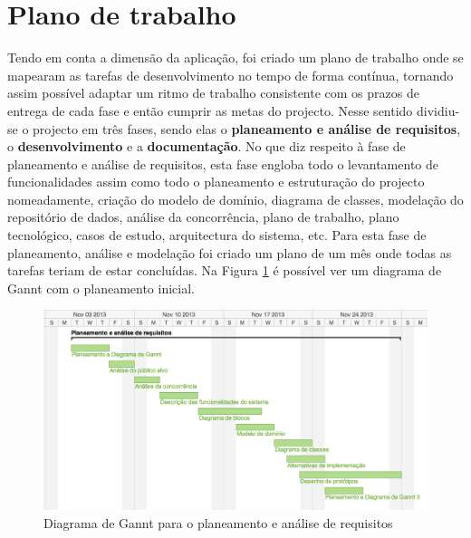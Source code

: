 \section{Plano de trabalho}
Tendo em conta a dimensão da aplicação, foi criado um plano de trabalho onde se mapearam as tarefas
de desenvolvimento no tempo de forma contínua, tornando assim possível adaptar um ritmo de trabalho
consistente com os prazos de entrega de cada fase e então cumprir as metas do projecto.
Nesse sentido dividiu-se o projecto em três fases, sendo elas o \textbf{planeamento e análise de requisitos}, o
\textbf{desenvolvimento} e a \textbf{documentação}.
No que diz respeito à fase de planeamento e análise de requisitos, esta fase engloba todo o levantamento 
de funcionalidades assim como todo o planeamento e estruturação do projecto 
nomeadamente, criação do modelo de domínio, diagrama de classes, modelação do repositório de dados,
análise da concorrência, plano de trabalho, plano tecnológico, casos de estudo, arquitectura do sistema, etc.
Para esta fase de planeamento, análise e modelação foi criado um plano de um mês onde todas as tarefas 
teriam de estar concluídas. Na Figura \ref{fig: workplan1} é possível ver um diagrama de Gannt com
o planeamento inicial.

\begin{figure}[htbp] 
	\centering
	\includegraphics[width=1\textwidth]{images/plano_de_trabalho/gannt_1.png}
 	\caption{Diagrama de Gannt para o planeamento e análise de requisitos}
 	\label{fig: workplan1}
\end{figure}

